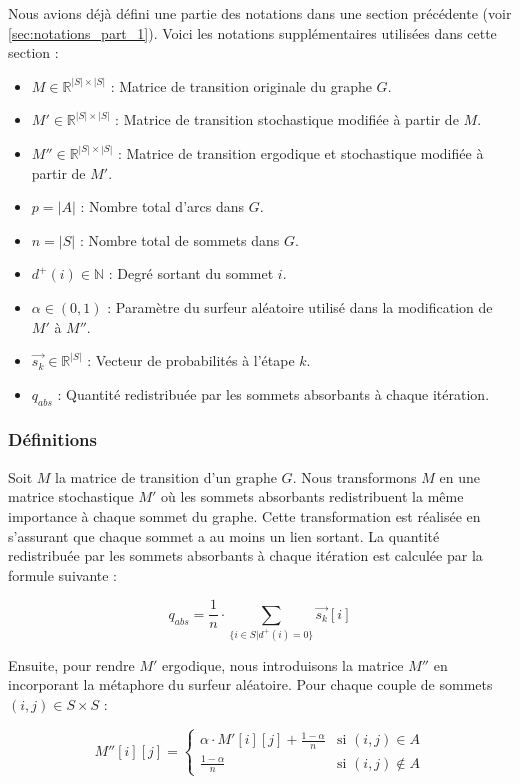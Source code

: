 Nous avions déjà défini une partie des notations dans une section précédente (voir \ref{sec:notations_part_1}). Voici les notations supplémentaires utilisées dans cette section :

\begin{itemize}
    \item $M \in \mathbb{R}^{|S| \times |S|}$ : Matrice de transition originale du graphe $G$.
    \item $M' \in \mathbb{R}^{|S| \times |S|}$ : Matrice de transition stochastique modifiée à partir de $M$.
    \item $M'' \in \mathbb{R}^{|S| \times |S|}$ : Matrice de transition ergodique et stochastique modifiée à partir de $M'$.
    \item $p = |A|$ : Nombre total d'arcs dans $G$.
    \item $n = |S|$ : Nombre total de sommets dans $G$.
    \item $d^+(i) \in \mathbb{N}$ : Degré sortant du sommet $i$.
    \item $\alpha \in (0, 1)$ : Paramètre du surfeur aléatoire utilisé dans la modification de $M'$ à $M''$.
    \item $\vec{s_k} \in \mathbb{R}^{|S|}$ : Vecteur de probabilités à l'étape $k$.
    \item $q_{abs}$ : Quantité redistribuée par les sommets absorbants à chaque itération.
\end{itemize}

\subsubsection{Définitions}

Soit $M$ la matrice de transition d'un graphe $G$. Nous transformons $M$ en une matrice stochastique $M'$ où les sommets absorbants redistribuent la même importance à chaque sommet du graphe. Cette transformation est réalisée en s'assurant que chaque sommet a au moins un lien sortant. La quantité redistribuée par les sommets absorbants à chaque itération est calculée par la formule suivante :

\[
q_{abs} = \frac{1}{n} \cdot \sum_{\{i \in S | d^+(i) = 0\}} \vec{s_k}[i]
\]

Ensuite, pour rendre $M'$ ergodique, nous introduisons la matrice $M''$ en incorporant la métaphore du surfeur aléatoire. Pour chaque couple de sommets $(i, j) \in S \times S$ :

\[
M''[i][j] = 
\begin{cases} 
\alpha \cdot M'[i][j] + \frac{1-\alpha}{n} & \text{si } (i, j) \in A \\
\frac{1-\alpha}{n} & \text{si } (i, j) \notin A 
\end{cases}
\]

